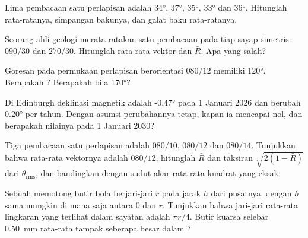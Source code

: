 \begin{exercise}[$\star\star$]\label{exo:b1:field-lab-methods-1:5}
Lima pembacaan  satu perlapisan adalah \ang{34}, \ang{37}, \ang{35}, \ang{33} dan \ang{36}. Hitunglah rata-ratanya, simpangan bakunya, dan galat baku rata-ratanya.
\end{exercise}

\begin{exercise}[$\star\star$]\label{exo:b1:field-lab-methods-1:6}
Seorang ahli geologi merata-ratakan satu pembacaan pada tiap sayap  simetris: $090/30$ dan $270/30$. Hitunglah rata-rata vektor dan $\bar R$. Apa yang salah?
\end{exercise}

\begin{exercise}[$\star\star$]\label{exo:b1:field-lab-methods-1:7}
Goresan pada permukaan perlapisan berorientasi $080/12$ memiliki  \ang{120}. Berapakah ? Berapakah bila  \ang{170}?
\end{exercise}

\begin{exercise}[$\star\star$]\label{exo:b1:field-lab-methods-1:8}
Di Edinburgh deklinasi magnetik adalah \ang{-0.47} pada 1 Januari 2026 dan berubah \ang{+0.20} per tahun. Dengan asumsi perubahannya tetap, kapan ia mencapai nol, dan berapakah nilainya pada 1 Januari 2030?
\end{exercise}

\begin{exercise}[$\star\star$]\label{exo:b1:field-lab-methods-1:9}
Tiga pembacaan satu perlapisan adalah $080/10$, $080/12$ dan $080/14$. Tunjukkan bahwa rata-rata vektornya adalah $080/12$, hitunglah $\bar R$ dan taksiran $\sqrt{2(1 - \bar R)}$ dari $\theta_{\text{rms}}$, dan bandingkan dengan sudut akar rata-rata kuadrat yang eksak.
\end{exercise}

\begin{exercise}[$\star\star\star$]\label{exo:b1:field-lab-methods-1:10}
Sebuah  memotong butir bola berjari-jari $r$ pada jarak $h$ dari pusatnya, dengan $h$ sama mungkin di mana saja antara 0 dan $r$. Tunjukkan bahwa jari-jari rata-rata lingkaran yang terlihat dalam sayatan adalah $\pi r/4$. Butir kuarsa selebar \qty{0.50}{mm} rata-rata tampak seberapa besar dalam ?
\end{exercise}

